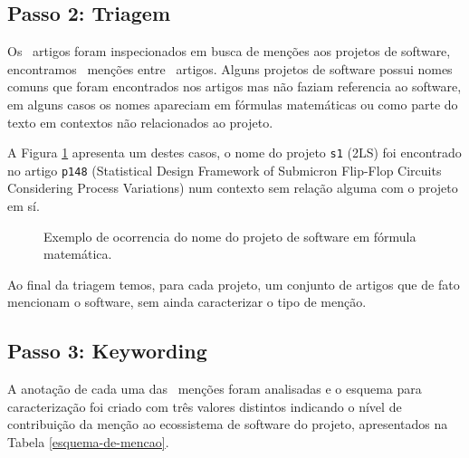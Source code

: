 

\subsection{Passo 2: Triagem}

Os \SearchUniqueCount \ artigos foram inspecionados em busca de menções aos
projetos de software, encontramos \ScreeningCount \ menções entre
\ScreeningUniqueCount \ artigos.
Alguns projetos de software possui nomes comuns que foram encontrados nos
artigos mas não faziam referencia ao software, em alguns casos os nomes
apareciam em fórmulas matemáticas ou como parte do texto em contextos não
relacionados ao projeto.

A Figura \ref{screenshot-paper-p148-2ls} apresenta um destes casos, o nome do
projeto \texttt{s1} (2LS) foi encontrado no artigo \texttt{p148} (Statistical
Design Framework of Submicron Flip-Flop Circuits Considering Process
Variations) num contexto sem relação alguma com o projeto em sí.

\begin{figure}[h]
  \center
  \caption{Exemplo de ocorrencia do nome do projeto de software em fórmula matemática.}
  \label{screenshot-paper-p148-2ls}
\end{figure}

Ao final da triagem temos, para cada projeto, um conjunto de artigos que de
fato mencionam o software, sem ainda caracterizar o tipo de menção.

\subsection{Passo 3: Keywording}

A anotação de cada uma das \ScreeningCount \ menções foram analisadas e o
esquema para caracterização foi criado com três valores distintos indicando o
nível de contribuição da menção ao ecossistema de software do projeto,
apresentados na Tabela \ref{esquema-de-mencao}.

